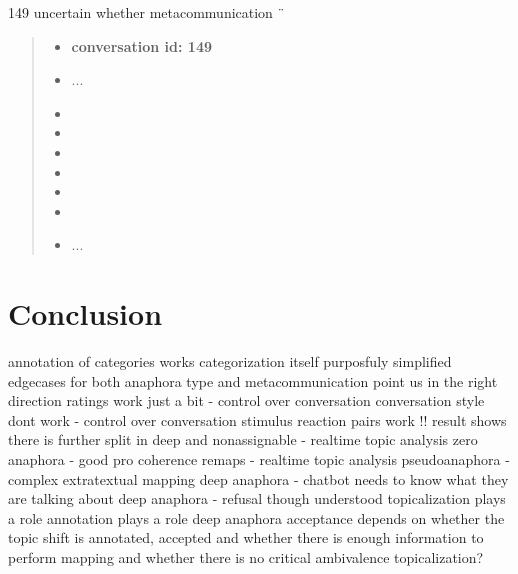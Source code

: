     149 uncertain whether metacommunication ¨
    \begin{quote}
    \begin{itemize}[label={}, leftmargin=0pt, itemsep=0.5em]
    \item \textbf{conversation id: 149}
    \item ...
    \item {}
    \item {}
    \item {}
    \item {}
    \item {}
    \item {}
    \item ...
    \end{itemize}
    \end{quote}

\section{Conclusion}

annotation of categories works
categorization itself purposfuly simplified
edgecases for both anaphora type and metacommunication point us in the right direction
ratings work just a bit - control over conversation
conversation style dont work - control over conversation
stimulus reaction pairs work !!
    result shows there is further split in deep and nonassignable - realtime topic analysis
zero anaphora - good
pro coherence
remaps - realtime topic analysis
pseudoanaphora - complex extratextual mapping
deep anaphora - chatbot needs to know what they are talking about
deep anaphora - refusal though understood
    topicalization plays a role
    annotation plays a role
deep anaphora acceptance depends on
whether the topic shift is annotated, accepted and
whether there is enough information to perform mapping and
whether there is no critical ambivalence
topicalization?
